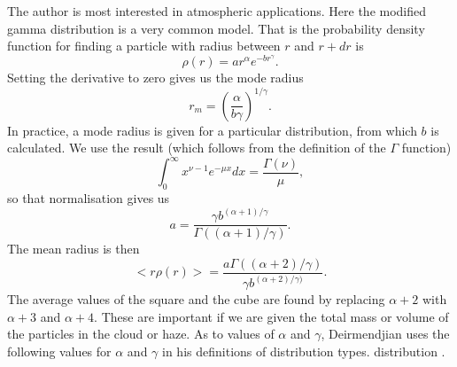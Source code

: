 \documentclass[12pt]{article}
\begin{document}
The author is most interested in atmospheric applications. Here the  modified
gamma distribution is a very common model.
That is the probability density function for finding a particle
with radius between $r$ and $r+dr$ is
\begin{equation}
\rho(r)= a r^\alpha e^{-b r^\gamma}.
\end{equation}
Setting the derivative to zero gives us the mode radius
\begin{equation}
r_m= \left ( \frac{\alpha}{ b \gamma } \right )^{1/\gamma}.
\end{equation}
In practice, a mode radius is given for a particular distribution, from which 
$b$ is calculated.
We use the result (which follows from the definition of the $\Gamma$ function)
\begin{equation}
\int_0^\infty x^{\nu-1} e^{-\mu x} d x= \frac{\Gamma (\nu)}{\mu},
\end{equation}
so that normalisation gives us
\begin{equation}
a= \frac{ \gamma b^{ (\alpha+1)/\gamma } }{ \Gamma((\alpha+1)/\gamma) }.
\end{equation}
The mean radius is then
\begin{equation}
< r \rho(r)> =\frac{ a \Gamma((\alpha+2)/\gamma) }{ \gamma b^{(\alpha+2)/\gamma)} }.
\end{equation}
The average values of the square and the cube are found by replacing
$\alpha+2$ with $\alpha+3$ and $\alpha+4$. These are important if
we are given the total mass or volume of the particles in the cloud or haze.
As to values of $\alpha$ and $\gamma$,
Deirmendjian uses the following values for $\alpha$ and $\gamma$ in his definitions
of distribution types.
distribution \cite{Deirmendjian:Miebib}. 
\end{document}
